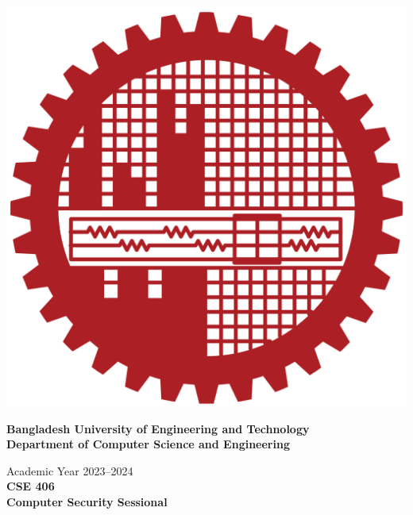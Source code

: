 \begin{titlepage}
    \begin{centering}
        \vspace*{0.1cm}
        
          
        \includegraphics[scale=.09]{images/buet_logo.png}
        
         \Large
         \textbf{Bangladesh University of Engineering and Technology}\\[.3cm]
         
        \large
         \textbf{Department of Computer Science and Engineering}
         \vspace{.3cm}
         
        Academic Year 2023--2024\\[1.5cm]
        \Large
        \textbf{CSE 406\\
        Computer Security Sessional\\}
        \vspace{.5cm}
        

\end{centering}
\end{titlepage}
